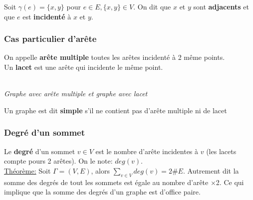 \documentclass[11pt]{article}
\begin{document}
			Soit $\gamma(e)=\{x,y\}$ pour $e \in E, \{x, y\} \in V$. On dit que $x$ et $y$ sont \textbf{adjacents} et que $e$ est \textbf{incidenté} à $x$ et $y$. \\
		
		\subsubsection{Cas particulier d'arête}
			On appelle \textbf{arête multiple} toutes les arêtes incidenté à 2 même points.\\
			Un \textbf{lacet} est une arête qui incidente le même point.
			\begin{center}
			 \\
			\textit{Graphe avec arête multiple et graphe avec lacet} \\
			\end{center}
		Un graphe est dit \textbf{simple} s'il ne contient pas d'arête multiple ni de lacet
		
		\subsubsection{Degré d'un sommet}
			Le \textbf{degré} d'un sommet $v \in V$ est le nombre d'arête incidentes à $v$ (les lacets compte pours 2 arêtes). On le note: $deg(v)$.\\
			
			\underline{Théorème:} Soit $\Gamma = (V,E)$, alors $\displaystyle \sum_{v \in V} deg(v) = 2\# E$. Autrement dit la somme des degrés de tout les sommets est égale au nombre d'arête $\times$2. Ce qui implique que la somme des degrés d'un graphe est d'office paire.\\
			
\end{document}
